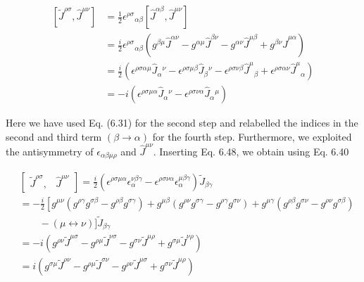 \documentclass[10pt, letterpaper]{article}
\begin{document}
$$
\begin{aligned}
{\left[\tilde{J}^{\rho \sigma}, \hat{J}^{\mu \nu}\right] } & =\frac{1}{2} \epsilon^{\rho \sigma}{ }_{\alpha \beta}\left[\hat{J}^{\alpha \beta}, \hat{J}^{\mu \nu}\right] \\
& =\frac{i}{2} \epsilon^{\rho \sigma}{ }_{\alpha \beta}\left(g^{\beta \mu} \hat{J}^{\alpha \nu}-g^{\alpha \mu} \hat{J}^{\beta \nu}-g^{\alpha \nu} \hat{J}^{\mu \beta}+g^{\beta \nu} \hat{J}^{\mu \alpha}\right) \\
& =\frac{i}{2}\left(\epsilon^{\rho \sigma \alpha \mu} \hat{J}_{\alpha}{ }^{\nu}-\epsilon^{\rho \sigma \mu \beta} \hat{J}_{\beta}{ }^{\nu}-\epsilon^{\rho \sigma \nu \beta} \hat{J}^{\mu}{ }_{\beta}+\epsilon^{\rho \sigma \alpha \nu} \hat{J}^{\mu}{ }_{\alpha}\right) \\
& =-i\left(\epsilon^{\rho \sigma \mu \alpha} \hat{J}_{\alpha}{ }^{\nu}-\epsilon^{\rho \sigma \nu \alpha} \hat{J}_{\alpha}{ }^{\mu}\right)
\end{aligned}
$$

Here we have used Eq. (6.31) for the second step and relabelled the indices in the second and third term $(\beta \rightarrow \alpha)$ for the fourth step. Furthermore, we exploited the antisymmetry of $\epsilon_{\alpha \beta \mu \rho}$ and $\hat{J}^{\mu \nu}$. Inserting Eq. 6.48, we obtain using Eq. 6.40

$$
\begin{aligned}
& {\left[\begin{array}{ll}
\tilde{J}^{\rho \sigma}, & \hat{J}^{\mu \nu}
\end{array}\right]=\frac{i}{2}\left(\epsilon^{\rho \sigma \mu \alpha} \epsilon_{\alpha}^{\nu \beta \gamma}-\epsilon^{\rho \sigma \nu \alpha} \epsilon_{\alpha}^{\mu \beta \gamma}\right) \tilde{J}_{\beta \gamma}} \\
& =-\frac{i}{2}\left[g^{\mu \nu}\left(g^{\rho \gamma} g^{\sigma \beta}-g^{\rho \beta} g^{\sigma \gamma}\right)+g^{\mu \beta}\left(g^{\rho \nu} g^{\sigma \gamma}-g^{\rho \gamma} g^{\sigma \nu}\right)+g^{\mu \gamma}\left(g^{\rho \beta} g^{\sigma \nu}-g^{\rho \nu} g^{\sigma \beta}\right)\right. \\
& \quad \quad-(\mu \leftrightarrow \nu)] \tilde{J}_{\beta \gamma} \\
& =-i\left(g^{\rho \nu} \tilde{J}^{\mu \sigma}-g^{\rho \mu} \tilde{J}^{\nu \sigma}-g^{\sigma \nu} \tilde{J}^{\mu \rho}+g^{\sigma \mu} \tilde{J}^{\nu \rho}\right) \\
& =i\left(g^{\sigma \mu} \tilde{J}^{\rho \nu}-g^{\rho \mu} \tilde{J}^{\sigma \nu}-g^{\rho \nu} \tilde{J}^{\mu \sigma}+g^{\sigma \nu} \tilde{J}^{\mu \rho}\right)
\end{aligned}
$$
\end{document}
